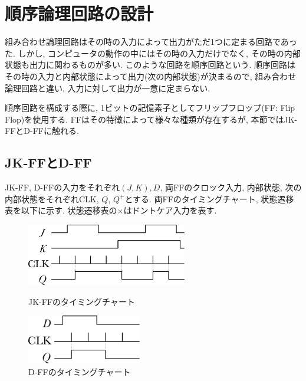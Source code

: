 \documentclass[titlepage]{jsarticle}
\begin{document}
\section{順序論理回路の設計}
  組み合わせ論理回路はその時の入力によって出力がただ1つに定まる回路であった.
  しかし, コンピュータの動作の中にはその時の入力だけでなく, その時の内部状態も出力に関わるものが多い.
  このような回路を順序回路という.
  順序回路はその時の入力と内部状態によって出力(次の内部状態)が決まるので,
  組み合わせ論理回路と違い, 入力に対して出力が一意に定まらない.

  順序回路を構成する際に, 1ビットの記憶素子としてフリップフロップ(FF: Flip Flop)を使用する.
  FFはその特徴によって様々な種類が存在するが, 本節ではJK-FFとD-FFに触れる.
  \subsection{JK-FFとD-FF} \label{subsec:jk_and_d}
    JK-FF, D-FFの入力をそれぞれ$(J, K), D$, 両FFのクロック入力,
    内部状態, 次の内部状態をそれぞれCLK, $Q$, $Q^+$とする.
    両FFのタイミングチャート, 状態遷移表を以下に示す.
    状態遷移表の$\times$はドントケア入力を表す.
    \begin{figure}[h]
      \begin{minipage}{0.495\hsize}
        \centering
        \includegraphics[width=7cm]{images/jk_timing.pdf}
        \caption{JK-FFのタイミングチャート}
      \end{minipage}
      \begin{minipage}{0.495\hsize}
        \centering
        \includegraphics[width=5cm]{images/d_timing.pdf}
        \caption{D-FFのタイミングチャート}
      \end{minipage}
    \end{figure}
\end{document}
